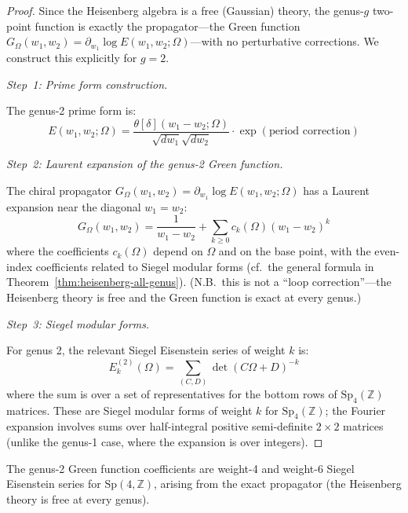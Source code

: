\begin{proof}
Since the Heisenberg algebra is a free (Gaussian) theory, the genus-$g$
two-point function is exactly the propagator---the Green function
$G_\Omega(w_1, w_2) = \partial_{w_1}\log E(w_1, w_2; \Omega)$---with
no perturbative corrections.  We construct this explicitly for $g = 2$.

\emph{Step~1: Prime form construction.}

The genus-2 prime form is:
\[E(w_1, w_2; \Omega) = \frac{\theta[\delta](w_1 - w_2; \Omega)}
{\sqrt{dw_1}\sqrt{dw_2}} \cdot \exp(\text{period correction})\]

\emph{Step~2: Laurent expansion of the genus-2 Green function.}

The chiral propagator $G_\Omega(w_1, w_2) = \partial_{w_1}\!\log E(w_1,w_2;\Omega)$ has a Laurent expansion near the diagonal $w_1 = w_2$:
\[G_\Omega(w_1, w_2) = \frac{1}{w_1-w_2} + \sum_{k \geq 0} c_k(\Omega)(w_1-w_2)^k\]
where the coefficients $c_k(\Omega)$ depend on $\Omega$ and on the base point, with the even-index coefficients related to Siegel modular forms (cf.\ the general formula in Theorem~\ref{thm:heisenberg-all-genus}).
(N.B.\ this is not a ``loop correction''---the Heisenberg theory is free and the Green function is exact at every genus.)

\emph{Step~3: Siegel modular forms.}

For genus 2, the relevant Siegel Eisenstein series of weight $k$ is:
\[
E_k^{(2)}(\Omega) = \sum_{(C,D)} \det(C\Omega + D)^{-k}
\]
where the sum is over a set of representatives for the bottom rows of $\mathrm{Sp}_4(\mathbb{Z})$ matrices.  These are Siegel modular forms of weight $k$ for $\mathrm{Sp}_4(\mathbb{Z})$; the Fourier expansion involves sums over half-integral positive semi-definite $2 \times 2$ matrices (unlike the genus-1 case, where the expansion is over integers).
\end{proof}

\begin{remark}\label{rem:genus-two-physical}
The genus-2 Green function coefficients are weight-4 and weight-6 Siegel Eisenstein series for $\mathrm{Sp}(4,\mathbb{Z})$, arising from the exact propagator (the Heisenberg theory is free at every genus).
\end{remark}

